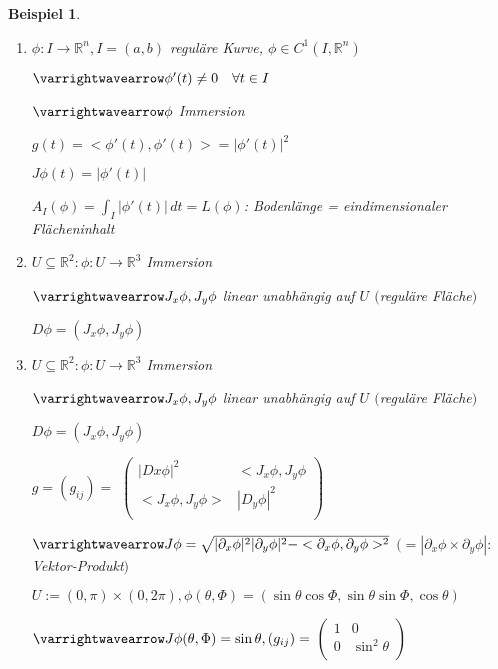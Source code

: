 \documentclass[11pt]{memoir}
\theoremstyle{changebreak}
\newtheorem{Beispiel}{Beispiel}[chapter]
\begin{document}


\begin{Beispiel}
\begin{enumerate}
	\item $\phi: I \rightarrow \mathbb R^n, I = (a, b)$ reguläre Kurve, $\phi \in C^1(I, \mathbb R^n)$
	\par
	$\varrightwavearrow \phi'(t) \ne 0 \quad \forall t\in I $
	\par
	$\varrightwavearrow \phi$ Immersion
	\par
	$g(t) = <\phi'(t), \phi'(t) > = |\phi'(t)|^2$
	\par
	$J\phi(t) = |\phi'(t)|$
	\par
	$A_I(\phi) = \int_I |\phi'(t)|\, dt = L(\phi)$: Bodenlänge = eindimensionaler Flächeninhalt

	\item $U \subseteq \mathbb R^2: \phi: U \rightarrow \mathbb R^3$ Immersion
	\par
	$\varrightwavearrow J_x \phi, J_y \phi$ linear unabhängig auf $U$ $($reguläre Fläche$)$
	\par
	$D\phi = (J_x \phi, J_y \phi)$ \\

	\item $U \subseteq \mathbb R^2: \phi: U \rightarrow \mathbb R^3$ Immersion
	\par
	$\varrightwavearrow J_x \phi, J_y \phi$ linear unabhängig auf $U$ $($reguläre Fläche$)$
	\par
	$D\phi = (J_x \phi, J_y \phi)$
	\par
	$g= (g_{ij}) =$
	$\begin{pmatrix}
      		|Dx\phi|^2 & 	<J_x\phi, J_y\phi \\
      		<J_x\phi, J_y\phi> &  	|D_y\phi|^2 \\
	\end{pmatrix}$
	\par\bigskip
	$\varrightwavearrow J\phi = \sqrt{|\partial_x \phi|^2 |\partial_y \phi|^2 - <\partial_x\phi, \partial_y\phi>^2}$ $(= |\partial_x\phi \times \partial_y \phi|: $Vektor-Produkt$)$
	\par
	$U:= (0, \pi) \times (0, 2\pi), \phi(\theta, \Phi) = (\sin\theta\cos\Phi, \sin\theta\sin\Phi, \cos\theta)$
	\par
	$\varrightwavearrow J\phi(\theta, \Phi) = \sin\theta, (g_{ij}) = $
	$\begin{pmatrix}
		1 & 0 \\
		0 & \sin^2 \theta \\
	\end{pmatrix}$


\end{enumerate}
\end{Beispiel}
\end{document}

